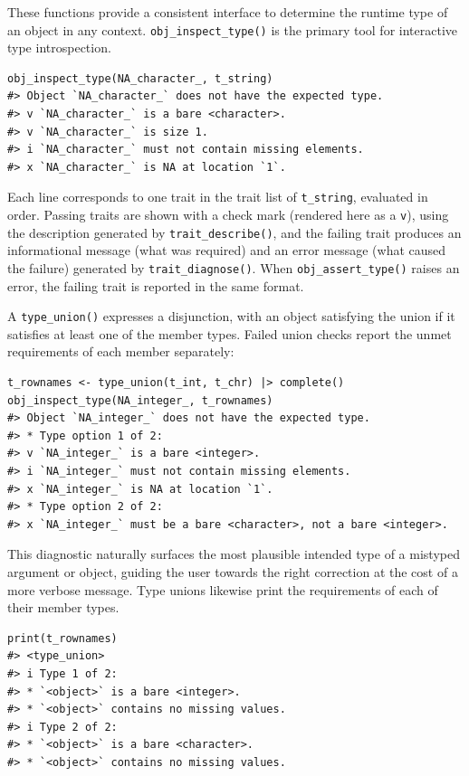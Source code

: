 These functions provide a consistent interface to determine the runtime type of an object in any context. \texttt{obj\_inspect\_type()} is the primary tool for interactive type introspection.

\begin{verbatim}
obj_inspect_type(NA_character_, t_string)
#> Object `NA_character_` does not have the expected type.
#> v `NA_character_` is a bare <character>.
#> v `NA_character_` is size 1.
#> i `NA_character_` must not contain missing elements.
#> x `NA_character_` is NA at location `1`.
\end{verbatim}

Each line corresponds to one trait in the trait list of \texttt{t\_string}, evaluated in order. Passing traits are shown with a check mark (rendered here as a \texttt{v}), using the description generated by \texttt{trait\_describe()}, and the failing trait produces an informational message (what was required) and an error message (what caused the failure) generated by \texttt{trait\_diagnose()}. When \texttt{obj\_assert\_type()} raises an error, the failing trait is reported in the same format.

A \texttt{type\_union()} expresses a disjunction, with an object satisfying the union if it satisfies at least one of the member types. Failed union checks report the unmet requirements of each member separately:

\begin{verbatim}
t_rownames <- type_union(t_int, t_chr) |> complete()
obj_inspect_type(NA_integer_, t_rownames)
#> Object `NA_integer_` does not have the expected type.
#> * Type option 1 of 2:
#> v `NA_integer_` is a bare <integer>.
#> i `NA_integer_` must not contain missing elements.
#> x `NA_integer_` is NA at location `1`.
#> * Type option 2 of 2:
#> x `NA_integer_` must be a bare <character>, not a bare <integer>.
\end{verbatim}

This diagnostic naturally surfaces the most plausible intended type of a mistyped argument or object, guiding the user towards the right correction at the cost of a more verbose message. Type unions likewise print the requirements of each of their member types.

\begin{verbatim}
print(t_rownames)
#> <type_union>
#> i Type 1 of 2:
#> * `<object>` is a bare <integer>.
#> * `<object>` contains no missing values.
#> i Type 2 of 2:
#> * `<object>` is a bare <character>.
#> * `<object>` contains no missing values.
\end{verbatim}

